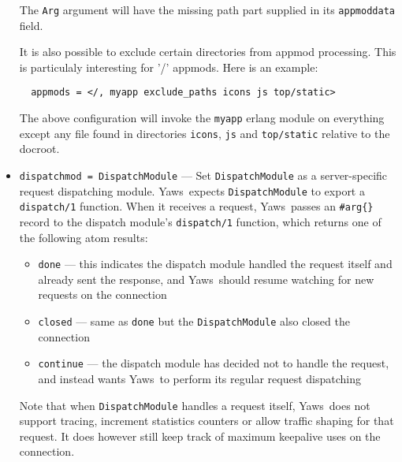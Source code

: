 \documentclass[11pt,oneside,english]{book}
\newcommand{\Yaws}            %
        {{\sc Yaws}}
\begin{document}
\begin{itemize}
             The \verb+Arg+ argument will have the missing path part supplied in
             its \verb+appmoddata+ field.

             It is also possible to exclude certain directories from appmod
             processing. This is particulaly interesting for '/' appmods.  Here
             is an example:
\begin{verbatim}
  appmods = </, myapp exclude_paths icons js top/static>
\end{verbatim}
             The above configuration will invoke the \verb+myapp+ erlang module
             on everything except any file found in directories \verb+icons+,
             \verb+js+ and \verb+top/static+ relative to the docroot.

\item       \verb+dispatchmod = DispatchModule+ ---
              Set \verb+DispatchModule+ as a server-specific request
              dispatching module. \Yaws\  expects \verb+DispatchModule+ to
              export a \verb+dispatch/1+ function. When it receives a
              request, \Yaws\  passes an \verb+#arg{}+ record to the dispatch
              module's \verb+dispatch/1+ function, which returns one of the
              following atom results:
              \begin{itemize}
                \item \verb+done+ --- this indicates the dispatch module
                  handled the request itself and already sent the response,
                  and \Yaws\  should resume watching for new requests on the
                  connection
                \item \verb+closed+ --- same as \verb+done+ but the
                  \verb+DispatchModule+ also closed the connection
                \item \verb+continue+ --- the dispatch module has decided
                  not to handle the request, and instead wants \Yaws\  to
                  perform its regular request dispatching
              \end{itemize}
              Note that when \verb+DispatchModule+ handles a request itself,
              \Yaws\  does not support tracing, increment statistics
              counters or allow traffic shaping for that request. It does
              however still keep track of maximum keepalive uses on the
              connection.


\end{itemize}
\end{document}

